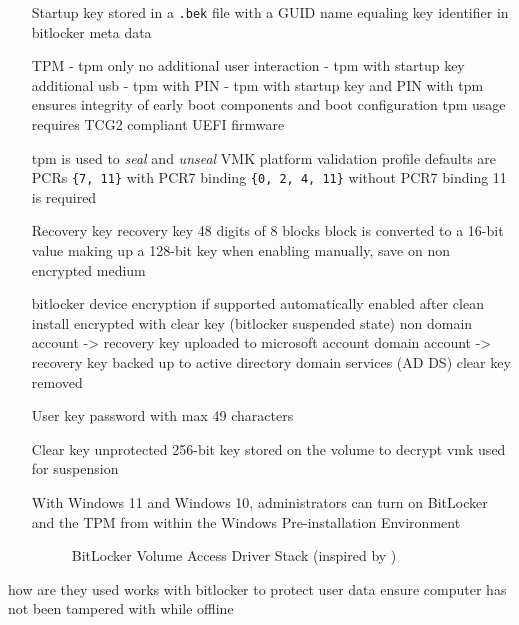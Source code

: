 \begin{itemize}
    \item[Startup key] stored in a \lstinline{.bek} file with a \ac{GUID} name equaling key identifier in bitlocker meta data
        \cite[Section 2.6]{bde-format-spec}
    \item[TPM]
        - tpm only
        no additional user interaction
        - tpm with startup key
        additional usb
        - tpm with PIN
        - tpm with startup key and PIN
        \cite{microsoft-bitlocker-countermeasures}
        with tpm ensures integrity of early boot components and boot configuration
        tpm usage requires \ac{TCG}2 compliant \ac{UEFI} firmware \cite[Section 9]{windows-internals-6-part2}

        tpm is used to \emph{seal} and \emph{unseal} \ac{VMK}
        platform validation profile
        defaults are \acp{PCR} \lstinline|{7, 11}| with PCR7 binding  \lstinline|{0, 2, 4, 11}| without PCR7 binding
        11 is required
    \item[Recovery key] recovery key 48 digits of 8 blocks
        block is converted to a 16-bit value making up a 128-bit key
        \cite[Section 2.4]{bde-format-spec}
        when enabling manually, save on non encrypted medium
        \cite{microsoft-bitlocker-basic-deployment}

        bitlocker device encryption if supported automatically enabled
        after clean install encrypted with clear key (bitlocker suspended state)
        non domain account -> recovery key uploaded to microsoft account
        domain account -> recovery key backed up to active directory domain services (AD DS)
        clear key removed
        \cite{microsoft-bitlocker-device-encryption}

    \item[User key] password with max 49 characters
        \cite[Section 2.7]{bde-format-spec}
    \item[Clear key] unprotected 256-bit key stored on the volume to decrypt vmk
        \cite[Section 2.5]{bde-format-spec}
        used for suspension


         With Windows 11 and Windows 10, administrators can turn on BitLocker and the TPM from within the Windows Pre-installation Environment \cite{microsoft-bitlocker-device-encryption}

        \begin{figure}[htb]%
            \centering
            
            \caption{BitLocker Volume Access Driver Stack (inspired by \cite[Figure 9-24]{windows-internals-6-part2})}%
            \label{fig:bitlocker-volume-access-driver-stack}%
        \end{figure}

\end{itemize}


how are they used
works with bitlocker to protect user data
ensure computer has not been tampered with while offline